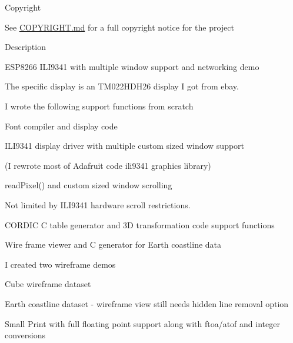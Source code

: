 \begin{DoxyParagraph}{Copyright}

\begin{DoxyItemize}
\item See \hyperlink{md_COPYRIGHT}{C\-O\-P\-Y\-R\-I\-G\-H\-T.md} for a full copyright notice for the project
\end{DoxyItemize}
\end{DoxyParagraph}
\begin{DoxyParagraph}{Description}

\begin{DoxyItemize}
\item E\-S\-P8266 I\-L\-I9341 with multiple window support and networking demo
\begin{DoxyItemize}
\item The specific display is an T\-M022\-H\-D\-H26 display I got from ebay.
\end{DoxyItemize}
\item I wrote the following support functions from scratch
\begin{DoxyItemize}
\item Font compiler and display code
\item I\-L\-I9341 display driver with multiple custom sized window support
\begin{DoxyItemize}
\item (I rewrote most of Adafruit code ili9341 graphics library)
\item read\-Pixel() and custom sized window scrolling
\item Not limited by I\-L\-I9341 hardware scroll restrictions.
\end{DoxyItemize}
\item C\-O\-R\-D\-I\-C C table generator and 3\-D transformation code support functions
\item Wire frame viewer and C generator for Earth coastline data
\begin{DoxyItemize}
\item I created two wireframe demos
\begin{DoxyItemize}
\item Cube wireframe dataset
\item Earth coastline dataset -\/ wireframe view still needs hidden line removal option
\end{DoxyItemize}
\end{DoxyItemize}
\item Small Print with full floating point support along with ftoa/atof and integer conversions

\end{DoxyItemize}
\end{DoxyItemize}
\end{DoxyParagraph}
